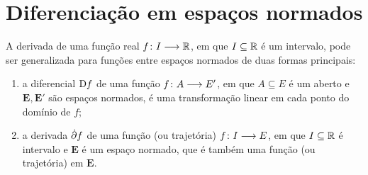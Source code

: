 \begin{comment}

\begin{proposition}
\label{prop:isometrias.multilineares.tensoriais}
Valem os seguintes isomorfismos isométricos:
\begin{enumerate}
	\item Para todos espaços normados $\bm E_0,\ldots,\bm E_{n-1}$ e $\bm E'$,
		\begin{equation*}
		\toplin(\bm E_0,\ldots,\bm E_{n-1}; \bm E') \simeq \toplin(\bm E_0 \otimes \cdots \otimes \bm E_{n-1}; \bm E').
		\end{equation*}
	\item Para todos espaços normados $\bm E$ e $\bm E'$ e todo $n \in \N$,
		\begin{equation*}
		\toplin^n(\bm E, \bm E') \simeq \toplin(\bm E^{\otimes n}, \bm E').
		\end{equation*}
	\item Para todos espaços normados $\bm E_0,\ldots,\bm E_{n-1}$ e $\bm E'$,
		\begin{equation*}
		\toplin(\bm E_0,\ldots,\bm E_{n-1}; \bm E') \simeq \toplin(\bm E_0, \toplin(\bm E_1, \ldots, \toplin(\bm E_{n-1}, \bm E')\ldots)).
		\end{equation*}
	\item Para todos espaços normados $\bm E$ e $\bm E'$ e todo $n \in \N$,
		\begin{equation*}
		\toplin^n(\bm E, \bm E') \simeq \toplin(\bm E, \toplin(\bm E,\ldots, \toplin(\bm E, \bm E')\ldots)).
		\end{equation*}
\end{enumerate}
\end{proposition}
\begin{proof}
Segue facilmente de \ref{prop:isomorfismos.multilineares.tensoriais} e \ref{prop:isometria.espacolinear.espacobilinear}.
\end{proof}

\end{comment}












\section{Diferenciação em espaços normados}

A derivada de uma função real ${f}\colon {I} \longrightarrow {\mathbb{R}}$, em que $I \subseteq \mathbb{R}$ é um intervalo, pode ser generalizada para funções entre espaços normados de duas formas principais:
	\begin{enumerate}
	\item a diferencial $\mathrm{D} f$ de uma função ${f}\colon {A} \longrightarrow {E'}$, em que $A \subseteq E$ é um aberto e $\bm E, \bm E'$ são espaços normados, é uma transformação linear em cada ponto do domínio de $f$;
	\item a derivada $\dot{\partial} f$ de uma função (ou trajetória) ${f}\colon {I} \longrightarrow {E}$, em que $I \subseteq \mathbb{R}$ é intervalo e $\bm E$ é um espaço normado, que é também uma função (ou trajetória) em $\bm E$.
	\end{enumerate}


